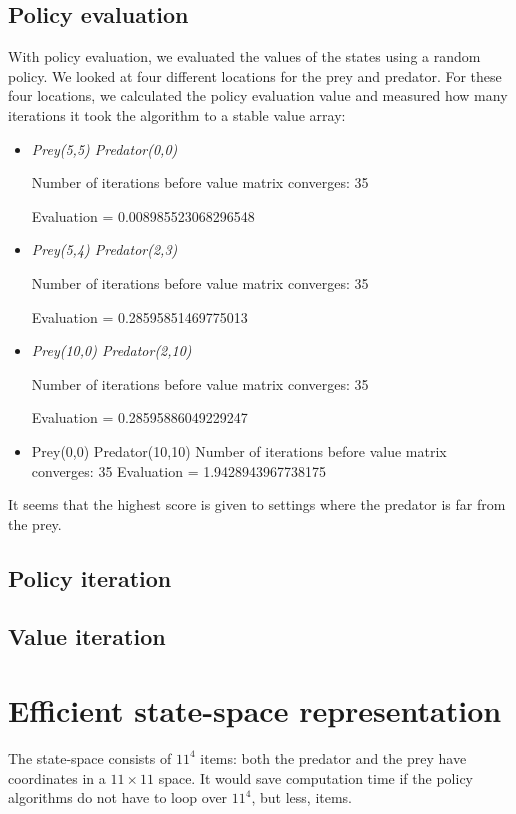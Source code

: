 \documentclass{article}
\begin{document}
\subsection{Policy evaluation}
With policy evaluation, we evaluated the values of the states using a random policy. We looked at four different locations for the prey and predator. For these four locations, we calculated the policy evaluation value and measured how many iterations it took the algorithm to a stable value array:

\begin{itemize}
\item \emph{Prey(5,5) Predator(0,0)}

Number of iterations before value matrix converges: 35

Evaluation = 0.008985523068296548

\item \emph{Prey(5,4) Predator(2,3)}

Number of iterations before value matrix converges: 35

Evaluation = 0.28595851469775013

\item \emph{Prey(10,0) Predator(2,10)}

Number of iterations before value matrix converges: 35

Evaluation = 0.28595886049229247

\item Prey(0,0) Predator(10,10)
Number of iterations before value matrix converges: 35
Evaluation = 1.9428943967738175
\end{itemize}

It seems that the highest score is given to settings where the predator is far from the prey.
\subsection{Policy iteration}

\subsection{Value iteration}

\section{Efficient state-space representation}
The state-space consists of $11^4$ items: both the predator and the prey have coordinates in a $11 \times 11$ space. It would save computation time if the policy algorithms do not have to loop over $11^4$, but less, items.
\end{document}
